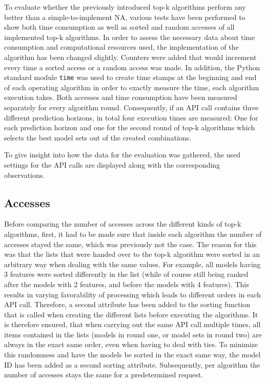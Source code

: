 To evaluate whether the previously introduced top-k algorithms perform any better than a simple-to-implement NA, various tests have been performed to show both time consumption as well as sorted and random accesses of all implemented top-k algorithms. In order to assess the necessary data about time consumption and computational resources used, the implementation of the algorithm has been changed slightly. Counters were added that would increment every time a sorted access or a random access was made. In addition, the Python standard module \texttt{time} was used to create time stamps at the beginning and end of each operating algorithm in order to exactly measure the time, each algorithm execution takes. Both accesses and time consumption have been measured separately for every algorithm round. Consequently, if an API call contains three different prediction horizons, in total four execution times are measured: One for each prediction horizon and one for the second round of top-k algorithms which selects the best model sets out of the created combinations. 

To give insight into how the data for the evaluation was gathered, the used settings for the API calls are displayed along with the corresponding observations. 



\subsection{Accesses}

Before comparing the number of accesses across the different kinds of top-k algorithms, first, it had to be made sure that inside each algorithm the number of accesses stayed the same, which was previously not the case. The reason for this was that the lists that were handed over to the top-k algorithm were sorted in an arbitrary way when dealing with the same values. For example, all models having 3 features were sorted differently in the list (while of course still being ranked after the models with 2 features, and before the models with 4 features). This results in varying favorability of processing which leads to different orders in each API call. Therefore, a second attribute has been added to the sorting function that is called when creating the different lists before executing the algorithms. It is therefore ensured, that when carrying out the same API call multiple times, all items contained in the lists (models in round one, or model sets in round two) are always in the exact same order, even when having to deal with ties. To minimize this randomness and have the models be sorted in the exact same way, the model ID has been added as a second sorting attribute. Subsequently, per algorithm the number of accesses stays the same for a predetermined request.



